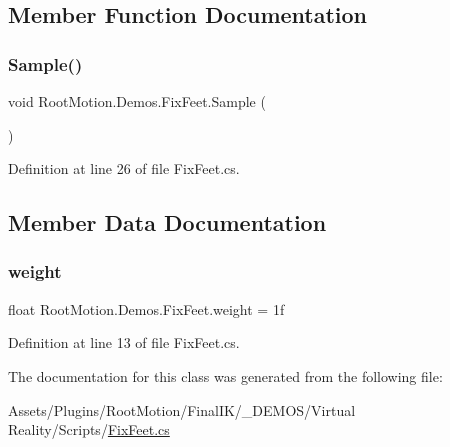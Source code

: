 \subsection{Member Function Documentation}
\mbox{\label{class_root_motion_1_1_demos_1_1_fix_feet_a3f194b6419c8dffd47f4f692f42c4665}} 
\subsubsection{\texorpdfstring{Sample()}{Sample()}}
{\footnotesize\ttfamily void Root\+Motion.\+Demos.\+Fix\+Feet.\+Sample (\begin{DoxyParamCaption}{ }\end{DoxyParamCaption})}



Definition at line 26 of file Fix\+Feet.\+cs.



\subsection{Member Data Documentation}
\mbox{\label{class_root_motion_1_1_demos_1_1_fix_feet_a8946d61f12032b424ff37f1e9a959d0d}} 
\subsubsection{\texorpdfstring{weight}{weight}}
{\footnotesize\ttfamily float Root\+Motion.\+Demos.\+Fix\+Feet.\+weight = 1f}



Definition at line 13 of file Fix\+Feet.\+cs.



The documentation for this class was generated from the following file\+:\begin{DoxyCompactItemize}
\item 
Assets/\+Plugins/\+Root\+Motion/\+Final\+I\+K/\+\_\+\+D\+E\+M\+O\+S/\+Virtual Reality/\+Scripts/\mbox{\hyperlink{_fix_feet_8cs}{Fix\+Feet.\+cs}}\end{DoxyCompactItemize}
